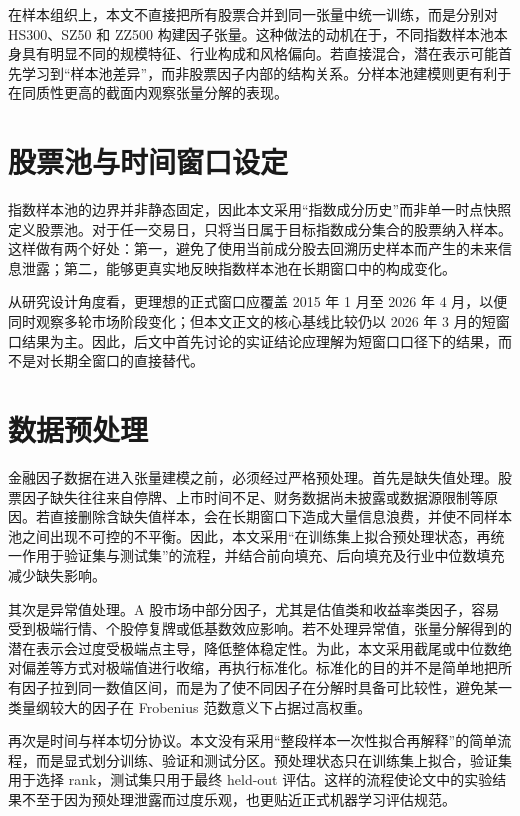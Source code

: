在样本组织上，本文不直接把所有股票合并到同一张量中统一训练，而是分别对 HS300、SZ50 和 ZZ500 构建因子张量。这种做法的动机在于，不同指数样本池本身具有明显不同的规模特征、行业构成和风格偏向。若直接混合，潜在表示可能首先学习到“样本池差异”，而非股票因子内部的结构关系。分样本池建模则更有利于在同质性更高的截面内观察张量分解的表现。

\section{股票池与时间窗口设定}

指数样本池的边界并非静态固定，因此本文采用“指数成分历史”而非单一时点快照定义股票池。对于任一交易日，只将当日属于目标指数成分集合的股票纳入样本。这样做有两个好处：第一，避免了使用当前成分股去回溯历史样本而产生的未来信息泄露；第二，能够更真实地反映指数样本池在长期窗口中的构成变化。

从研究设计角度看，更理想的正式窗口应覆盖 2015 年 1 月至 2026 年 4 月，以便同时观察多轮市场阶段变化；但本文正文的核心基线比较仍以 2026 年 3 月的短窗口结果为主。因此，后文中首先讨论的实证结论应理解为短窗口口径下的结果，而不是对长期全窗口的直接替代。

\section{数据预处理}

金融因子数据在进入张量建模之前，必须经过严格预处理。首先是缺失值处理。股票因子缺失往往来自停牌、上市时间不足、财务数据尚未披露或数据源限制等原因。若直接删除含缺失值样本，会在长期窗口下造成大量信息浪费，并使不同样本池之间出现不可控的不平衡。因此，本文采用“在训练集上拟合预处理状态，再统一作用于验证集与测试集”的流程，并结合前向填充、后向填充及行业中位数填充减少缺失影响。

其次是异常值处理。A 股市场中部分因子，尤其是估值类和收益率类因子，容易受到极端行情、个股停复牌或低基数效应影响。若不处理异常值，张量分解得到的潜在表示会过度受极端点主导，降低整体稳定性。为此，本文采用截尾或中位数绝对偏差等方式对极端值进行收缩，再执行标准化。标准化的目的并不是简单地把所有因子拉到同一数值区间，而是为了使不同因子在分解时具备可比较性，避免某一类量纲较大的因子在 Frobenius 范数意义下占据过高权重。

再次是时间与样本切分协议。本文没有采用“整段样本一次性拟合再解释”的简单流程，而是显式划分训练、验证和测试分区。预处理状态只在训练集上拟合，验证集用于选择 rank，测试集只用于最终 held-out 评估。这样的流程使论文中的实验结果不至于因为预处理泄露而过度乐观，也更贴近正式机器学习评估规范。

